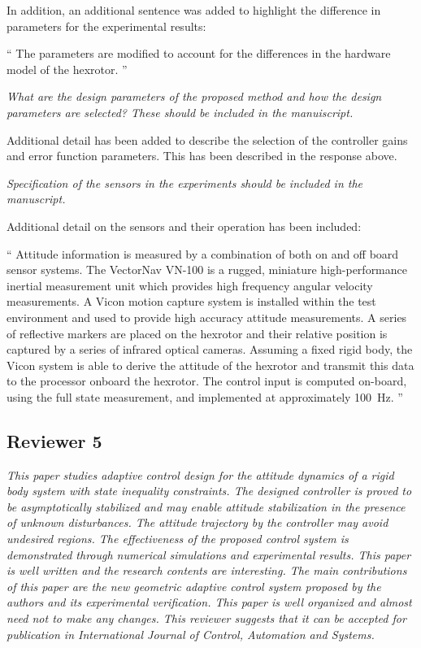 \documentclass[11pt]{article}
\newenvironment{correction}{\begin{list}{}{\setlength{\leftmargin}{1cm}\setlength{\rightmargin}{1cm}}\vspace{\parsep}\item[]``}{''\end{list}}
\begin{document}
\begin{enumerate}
In addition, an additional sentence was added to highlight the difference in parameters for the experimental results:
\begin{correction}
    The parameters are modified to account for the differences in the hardware model of the hexrotor.
\end{correction}

\item \textit{What are the design parameters of the proposed method and how the design parameters are selected? These should be included in the manuiscript.}

Additional detail has been added to describe the selection of the controller gains and error function parameters. 
This has been described in the response above.

\item \textit{Specification of the sensors in the experiments should be included in the manuscript.}

Additional detail on the sensors and their operation has been included:
\begin{correction}
    Attitude information is measured by a combination of both on and off board sensor systems.
    The VectorNav VN-100 is a rugged, miniature high-performance inertial measurement unit which provides high frequency angular velocity measurements.
    A Vicon motion capture system is installed within the test environment and used to provide high accuracy attitude measurements. 
    A series of reflective markers are placed on the hexrotor and their relative position is captured by a series of infrared optical cameras. 
    Assuming a fixed rigid body, the Vicon system is able to derive the attitude of the hexrotor and transmit this data to the processor onboard the hexrotor.
    The control input is computed on-board, using the full state measurement, and implemented at approximately \SI{100}{\hertz}.
\end{correction}
\end{enumerate}

\subsection*{Reviewer 5}
\textit{This paper studies adaptive control design for the attitude dynamics of a rigid body system with state inequality constraints. The designed controller is proved to be asymptotically stabilized and may enable attitude stabilization in the presence of unknown disturbances. The attitude trajectory by the controller may avoid undesired regions. The effectiveness of the proposed control system is demonstrated through numerical simulations and experimental results. This paper is well written and the research contents are interesting. The main contributions of this paper are the new geometric adaptive control system proposed by the authors and its experimental verification. This paper is well organized and almost need not to make any changes. This reviewer suggests that it can be accepted for publication in International Journal of Control, Automation and Systems.}
\end{document}
